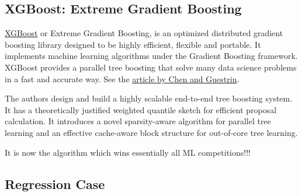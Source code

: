 \documentclass[%
oneside,                 %
final,                   %
10pt]{article}
\begin{document}
\subsection*{XGBoost: Extreme Gradient Boosting}


\href{{https://github.com/dmlc/xgboost}}{XGBoost} or Extreme Gradient
Boosting, is an optimized distributed gradient boosting library
designed to be highly efficient, flexible and portable. It implements
machine learning algorithms under the Gradient Boosting
framework. XGBoost provides a parallel tree boosting that solve many
data science problems in a fast and accurate way. See the \href{{https://arxiv.org/abs/1603.02754}}{article by Chen and Guestrin}.

The authors design and build a highly scalable end-to-end tree
boosting system. It has  a theoretically justified weighted quantile
sketch for efficient proposal calculation. It introduces a novel sparsity-aware algorithm for parallel tree learning and an effective cache-aware block structure for out-of-core tree learning.

It is now the algorithm which wins essentially all ML competitions!!!

\subsection*{Regression Case}
\end{document}

